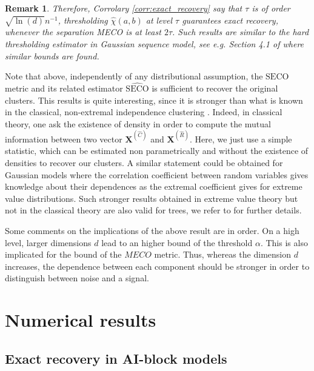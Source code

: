 \documentclass[11pt]{article}
\newcommand{\SECO}{\mathrm{SECO}}
\newtheorem{remark}{Remark}
\begin{document}
	\begin{remark}
		Therefore, Corrolary \ref{corr:exact_recovery} say that $\tau$ is of order $\sqrt{\ln(d)} n^{-1}$, thresholding $\hat{\chi}(a,b)$ at level $\tau$ guarantees exact recovery, whenever the separation MECO is at least $2 \tau$. Such results are similar to the hard thresholding estimator in Gaussian sequence model, see e.g. Section 4.1 of \cite{tsybakov2014aggregation} where similar bounds are found.
	\end{remark}
	Note that above, independently of any distributional assumption, the $\SECO$ metric and its related estimator $\widehat{\SECO}$ is sufficient to recover the original clusters. This results is quite interesting, since it is stronger than what is known in the classical, non-extremal independence clustering \cite{NIPS2017_37d097ca}. Indeed, in classical theory, one ask the existence of density in order to compute the mutual information between two vector $\textbf{X}^{(\hat{C})}$ and $\textbf{X}^{(\hat{R})}$. Here, we just use a simple statistic, which can be estimated non parametrically and without the existence of densities to recover our clusters. A similar statement could be obtained for Gaussian models where the correlation coefficient between random variables gives knowledge about their dependences as the extremal coefficient gives for extreme value distributions. Such stronger results obtained in extreme value theory but not in the classical theory are also valid for trees, we refer to \cite{engelke2020structure} for further details.
	
	Some comments on the implications of the above result are in order. On a high level, larger dimensions $d$ lead to an higher bound of the threshold $\alpha$. This is also implicated for the bound of the $MECO$ metric. Thus, whereas the dimension $d$ increases, the dependence between each component should be stronger in order to distinguish between noise and a signal.
	
	\section{Numerical results}
	
		\subsection{Exact recovery in AI-block models}
	
\end{document}
